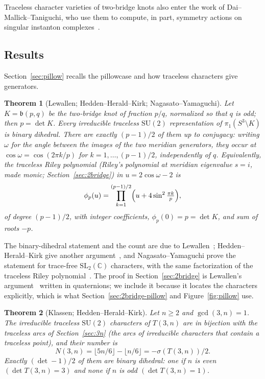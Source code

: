 \documentclass[11pt,reqno]{amsart}
\theoremstyle{plain}
\newtheorem{theorem}{Theorem}[section]
\theoremstyle{definition}
\newcommand{\C}{\mathbb{C}}
\newcommand{\SU}{\mathrm{SU}(2)}
\newcommand{\bp}{\mathfrak{b}}
\begin{document}
Traceless character varieties of two-bridge knots also enter the work of
Dai--Mallick--Taniguchi, who use them to compute, in part, symmetry actions on singular instanton
complexes~\cite{DMT}.

\subsection{Results}\label{sec:intro-results}
Section~\ref{sec:pillow} recalls the pillowcase and how traceless characters give generators.

\begin{theorem}[Lewallen; Hedden--Herald--Kirk; Nagasato--Yamaguchi]\label{thm:A}
Let $K=\bp(p,q)$ be the two-bridge knot of fraction $p/q$, normalized so that $q$ is odd; then
$p=\det K$. Every irreducible
traceless $\SU$ representation of $\pi_1(S^3\setminus K)$ is binary dihedral. There are exactly
$(p-1)/2$ of them up to conjugacy: writing $\omega$ for the angle between the images of the two meridian
generators, they occur at $\cos\omega=\cos(2\pi k/p)$ for $k=1,\dots,(p-1)/2$, independently of $q$.
Equivalently, the traceless Riley polynomial (Riley's polynomial at meridian eigenvalue $s=i$, made monic;
Section~\ref{sec:2bridge}) in $u=2\cos\omega-2$ is
\[
\phi_p(u)=\prod_{k=1}^{(p-1)/2}\Bigl(u+4\sin^2\tfrac{\pi k}{p}\Bigr),
\]
of degree $(p-1)/2$, with integer coefficients, $\phi_p(0)=p=\det K$, and sum of roots $-p$.
\end{theorem}

The binary-dihedral statement and the count are due to Lewallen~\cite[Prop.~2.3, Thm.~2.4 and the
remark after Thm.~2.5]{Lewallen}; Hedden--Herald--Kirk give another argument~\cite[Thm.~10.2]{HHK1},
and Nagasato--Yamaguchi prove the statement for trace-free $\mathrm{SL}_2(\C)$ characters, with the same
factorization of the traceless Riley polynomial~\cite[Thms.~7.5 and 7.6]{NY}. The proof in
Section~\ref{sec:2bridge} is Lewallen's argument~\cite[proof of Prop.~2.3]{Lewallen} written in
quaternions; we include it because it locates the characters explicitly, which is what
Section~\ref{sec:2bridge-pillow} and Figure~\ref{fig:pillow} use.

\begin{theorem}[Klassen; Hedden--Herald--Kirk]\label{thm:B}
Let $n\ge2$ and $\gcd(3,n)=1$. The irreducible traceless $\SU$ characters of $T(3,n)$ are in bijection
with the traceless arcs of Section~\ref{sec:3n} (the arcs of irreducible characters that contain a
traceless point), and their number is
\[
N(3,n)=\lfloor 5n/6\rfloor-\lfloor n/6\rfloor=-\sigma(T(3,n))/2.
\]
Exactly $(\det-1)/2$ of them are binary dihedral: one if $n$ is even $(\det T(3,n)=3)$ and none if $n$
is odd $(\det T(3,n)=1)$.
\end{theorem}
\end{document}

